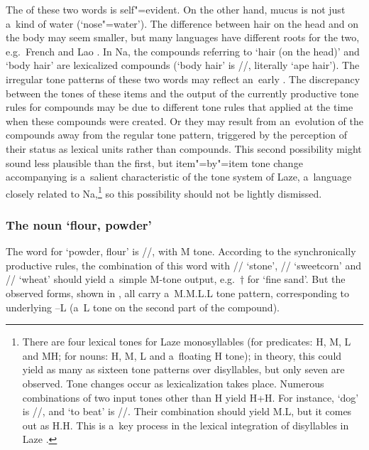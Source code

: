 The  of these two words is self"=evident. On the other hand, mucus is not just
a~kind of water (‘nose"=water’). The difference between hair on the head and on the body may seem smaller,
but many languages have different roots for the two, e.g.~{French} and Lao \citep[187-188]{enfield2006body}. In Na, 
the compounds referring to ‘hair (on the head)’ and ‘body hair’ are lexicalized compounds (‘body hair’ is //, literally ‘ape hair’). The irregular tone patterns of these two words may reflect an~early . The discrepancy between the tones of these items and the output of the currently
productive tone rules for compounds may be due to different tone rules that applied at the time when these compounds were created. Or they may result from an~evolution of the compounds away from the regular tone
pattern, triggered by the perception of their status as lexical units rather than compounds. This second possibility might sound less plausible than the first, but item"=by"=item tone
change accompanying  is a~salient characteristic of the tone system of Laze,
a~language closely related to Na,\footnote{There are four lexical tones for {Laze} monosyllables (for predicates: H, M, L and MH; for nouns: H, M, L and a~floating H tone); in
	theory, this could yield as many as sixteen tone patterns over disyllables, but only seven are
	observed. Tone
	changes occur as {lexicalization} takes place. Numerous combinations of two input tones other than H yield H+H. For instance, ‘dog’ is //, and ‘to beat’ is //. Their combination should
	yield M.L, but it comes out as H.H. This is a~key process in the lexical
	integration of disyllables in {Laze} \citep{michaud2008a,michaud2009a,michaudetal2012c}.} so this
possibility should not be lightly dismissed.

\subsubsection{The noun ‘flour, powder’}
\label{sec:thenounflourpowder}

The word for ‘powder, flour’ is //, with M tone. According to the synchronically
productive rules, the combination of this word with // ‘stone’, //
‘sweetcorn’ and // ‘wheat’ should yield a~simple M-tone output,
e.g.~$\dagger$ for ‘fine sand’. But the observed forms, shown in , all carry a~M.M.L.L tone pattern, corresponding to underlying --L (a~L tone on the second part of the compound). 

